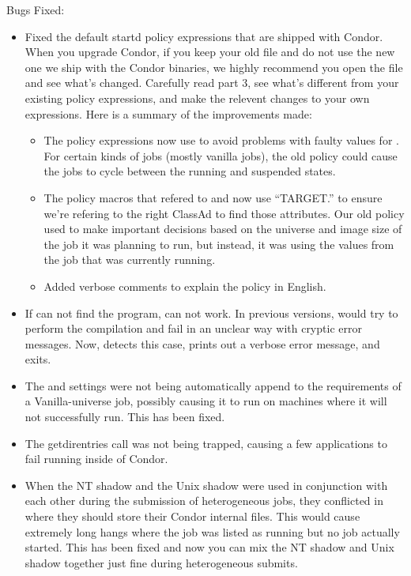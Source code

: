 \noindent Bugs Fixed:
\begin{itemize}

\item Fixed the default startd policy expressions that are shipped
with Condor.
When you upgrade Condor, if you keep your old 
file and do not use the new one we ship with the Condor binaries, we
highly recommend you open the 
file and see what's changed.
Carefully read part 3, see what's different from your existing policy
expressions, and make the relevent changes to your own expressions.
Here is a summary of the improvements made:
\begin{itemize}
  \item The policy expressions now use  to avoid
  problems with faulty values for .
  For certain kinds of jobs (mostly vanilla jobs), the old policy
  could cause the jobs to cycle between the running and suspended
  states.
  \item The policy macros that refered to  and
   now use ``TARGET.'' to ensure we're refering to the
  right ClassAd to find those attributes.
  Our old policy used to make important decisions based on the
  universe and image size of the job it was planning to run, but
  instead, it was using the values from the job that was currently
  running.
  \item Added verbose comments to explain the policy in English.
\end{itemize}

\item If  can not find the 
program,  can not work.
In previous versions,   would try to perform the
compilation and fail in an unclear way with cryptic error messages. 
Now,  detects this case, prints out a verbose error
message, and exits.

\item The  and  settings were
not being automatically append to the requirements of a Vanilla-universe job,
possibly causing it to run on machines where it will not successfully run. This
has been fixed.

\item The getdirentries call was not being trapped, causing a few applications
to fail running inside of Condor.

\item When the NT shadow and the Unix shadow were used in conjunction with each
other during the submission of heterogeneous jobs, they conflicted in where 
they should store their Condor internal files. This would cause extremely
long hangs where the job was listed as running but no job actually started.
This has been fixed and now you can mix the NT shadow and Unix shadow
together just fine during heterogeneous submits.


\end{itemize}
